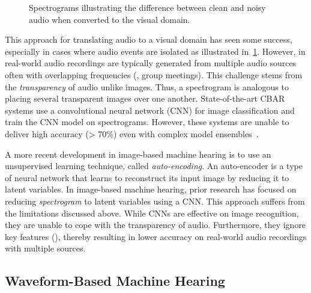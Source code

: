 \begin{figure}[!tbp]
    \centering
    \hfill
    \caption{Spectrograms illustrating the difference between clean and noisy audio when converted to the visual domain.}
    \label{fig:noisy-audio-cmpr}
\end{figure}

This approach for translating audio to a visual domain has seen some success,
especially in cases where audio events are isolated as illustrated
in~\cref{fig:noisy-audio-cmpr}.
However, in real-world audio recordings are typically generated from multiple
audio sources often with overlapping frequencies (\eg, group meetings).
This challenge stems from the \textit{transparency} of audio unlike images. 
Thus, a spectrogram is analogous to placing several transparent images 
over one another. 
State-of-the-art CBAR systems use a convolutional neural network (CNN) for 
image classification and
train the CNN model on spectrograms.
However, these systems are unable to deliver high accuracy (> 70\%) even with
complex model ensembles~\cite{xu-large-scale-2018,piczak-environmental-2015}.

A more recent development in image-based machine hearing is to use an
unsupervised learning technique, called \textit{auto-encoding}. 
An auto-encoder is a type of neural network that learns to reconstruct its 
input image by reducing it to latent variables.
In image-based machine hearing, prior research has focused on reducing 
\textit{spectrogram} to latent variables using a CNN.
This approach suffers from the limitations discussed above.
While CNNs are effective on image recognition, they are unable to cope with the
transparency of audio. Furthermore, they ignore key features (),
thereby resulting in lower accuracy on real-world audio recordings with
multiple sources.

\subsection{Waveform-Based Machine Hearing}

